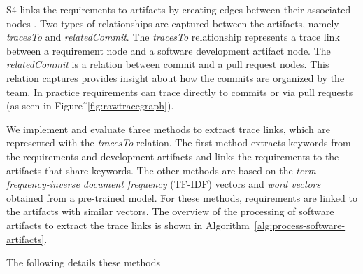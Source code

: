       \textsf{S4}  links the requirements to artifacts by creating edges between their associated nodes . 
      Two types of relationships are captured between the artifacts, namely \emph{tracesTo} and \emph{relatedCommit}. 
      The  \emph{tracesTo} relationship represents a trace link between a requirement node and a software development artifact node. 
      The \emph{relatedCommit} is a relation between commit and a pull request nodes. 
      This relation captures provides insight about how the commits are organized by the team. 
      In practice requirements can trace directly to commits or via pull requests (as seen in Figure˜\ref{fig:rawtracegraph}).

      We implement and evaluate three methods to extract trace links, which are represented with the \emph{tracesTo} relation. 
 The first method extracts keywords from the requirements and development artifacts and links the requirements to the artifacts that share keywords. 
 The other methods are based on the \textit{term frequency-inverse document frequency} (TF-IDF) vectors and \textit{word vectors} obtained from a pre-trained model.
For these methods, requirements are linked to the artifacts with similar vectors. 
      The overview of the processing of software artifacts to extract the trace links is shown in Algorithm~\ref{alg:process-software-artifacts}.
            

 The following details these methods %


